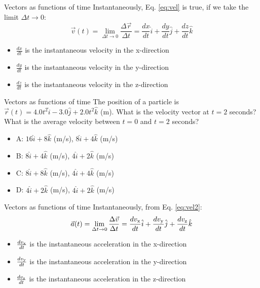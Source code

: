 \documentclass{beamer}
\begin{document}
\begin{frame}{Vectors as functions of time}
Instantaneously, Eq. \ref{eq:vel} is true, if we \alert{take the limit} $\Delta t \to 0$:
\begin{equation}
\vec{v}(t) = \lim_{\Delta t \to 0} \frac{\Delta\vec{r}}{\Delta t} = \frac{dx}{dt}\hat{i} + \frac{dy}{dt}\hat{j} + \frac{dz}{dt}\hat{k}
\label{eq:vel2}
\end{equation}
\begin{itemize}
\item $\frac{dx}{dt}$ is the instantaneous velocity in the x-direction
\item $\frac{dy}{dt}$ is the instantaneous velocity in the y-direction
\item $\frac{dz}{dt}$ is the instantaneous velocity in the z-direction
\end{itemize}
\end{frame}

\begin{frame}{Vectors as functions of time}
The position of a particle is $\vec{r}(t) = 4.0t^2\hat{i} - 3.0 \hat{j} + 2.0t^2\hat{k}$ (m).  What is the velocity vector at $t=2$ seconds?  What is the average velocity between $t=0$ and $t=2$ seconds?
\begin{itemize}
\item A: $16\hat{i} + 8\hat{k}$ (m/s), $8\hat{i} + 4\hat{k}$ (m/s)
\item B: $8\hat{i} + 4\hat{k}$ (m/s), $4\hat{i} + 2\hat{k}$ (m/s)
\item C: $8\hat{i} + 8\hat{k}$ (m/s), $4\hat{i} + 4\hat{k}$ (m/s)
\item D: $4\hat{i} + 2\hat{k}$ (m/s), $4\hat{i} + 2\hat{k}$ (m/s)
\end{itemize}
\end{frame}

\begin{frame}{Vectors as functions of time}
Instantaneously, from Eq. \ref{eq:vel2}: 
\begin{equation}
\vec{a}(t) = \lim_{\Delta t \to 0} \frac{\Delta\vec{v}}{\Delta t} = \frac{dv_{\rm x}}{dt}\hat{i} + \frac{dv_{\rm y}}{dt}\hat{j} + \frac{dv_{\rm z}}{dt}\hat{k}
\label{eq:vel3}
\end{equation}
\begin{itemize}
\item $\frac{dv_{\rm x}}{dt}$ is the instantaneous acceleration in the x-direction
\item $\frac{dv_{\rm y}}{dt}$ is the instantaneous acceleration in the y-direction
\item $\frac{dv_{\rm z}}{dt}$ is the instantaneous acceleration in the z-direction
\end{itemize}
\end{frame}
\end{document}
